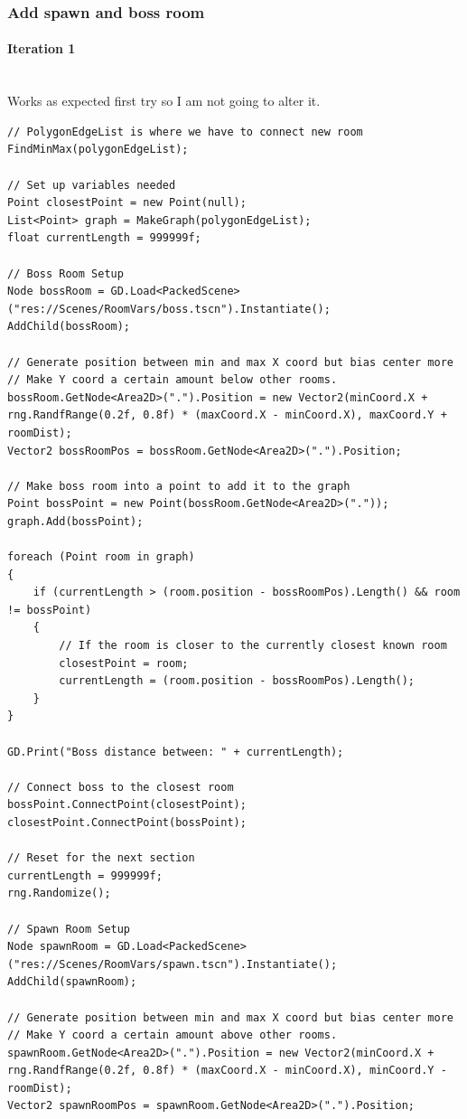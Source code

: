 \documentclass{article}
\newcommand{\myparagraph}[1]{\paragraph{#1}\mbox{}\\} %
\begin{document}
\subsubsection{Add spawn and boss room}
\myparagraph{Iteration 1}
Works as expected first try so I am not going to alter it.
\begin{lstlisting}
// PolygonEdgeList is where we have to connect new room
FindMinMax(polygonEdgeList);

// Set up variables needed
Point closestPoint = new Point(null);
List<Point> graph = MakeGraph(polygonEdgeList);
float currentLength = 999999f;

// Boss Room Setup
Node bossRoom = GD.Load<PackedScene>("res://Scenes/RoomVars/boss.tscn").Instantiate();
AddChild(bossRoom);

// Generate position between min and max X coord but bias center more
// Make Y coord a certain amount below other rooms.
bossRoom.GetNode<Area2D>(".").Position = new Vector2(minCoord.X + rng.RandfRange(0.2f, 0.8f) * (maxCoord.X - minCoord.X), maxCoord.Y + roomDist);
Vector2 bossRoomPos = bossRoom.GetNode<Area2D>(".").Position;

// Make boss room into a point to add it to the graph
Point bossPoint = new Point(bossRoom.GetNode<Area2D>("."));
graph.Add(bossPoint);

foreach (Point room in graph)
{
    if (currentLength > (room.position - bossRoomPos).Length() && room != bossPoint)
    {
        // If the room is closer to the currently closest known room
        closestPoint = room;
        currentLength = (room.position - bossRoomPos).Length();
    }
}

GD.Print("Boss distance between: " + currentLength);

// Connect boss to the closest room
bossPoint.ConnectPoint(closestPoint);
closestPoint.ConnectPoint(bossPoint);

// Reset for the next section
currentLength = 999999f;
rng.Randomize();

// Spawn Room Setup
Node spawnRoom = GD.Load<PackedScene>("res://Scenes/RoomVars/spawn.tscn").Instantiate();
AddChild(spawnRoom);

// Generate position between min and max X coord but bias center more
// Make Y coord a certain amount above other rooms.
spawnRoom.GetNode<Area2D>(".").Position = new Vector2(minCoord.X + rng.RandfRange(0.2f, 0.8f) * (maxCoord.X - minCoord.X), minCoord.Y - roomDist);
Vector2 spawnRoomPos = spawnRoom.GetNode<Area2D>(".").Position;


\end{lstlisting}
\end{document}
